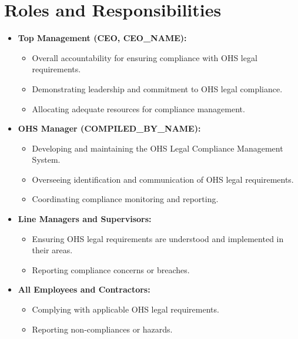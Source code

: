 \documentclass[12pt]{article}
\begin{document}
\section{Roles and Responsibilities}
\begin{itemize}
    \item \textbf{Top Management (CEO, {{CEO_NAME}}):}
    \begin{itemize}
        \item Overall accountability for ensuring compliance with OHS legal requirements.
        \item Demonstrating leadership and commitment to OHS legal compliance.
        \item Allocating adequate resources for compliance management.
    \end{itemize}
    \item \textbf{OHS Manager ({{COMPILED_BY_NAME}}):}
    \begin{itemize}
        \item Developing and maintaining the OHS Legal Compliance Management System.
        \item Overseeing identification and communication of OHS legal requirements.
        \item Coordinating compliance monitoring and reporting.
    \end{itemize}
    \item \textbf{Line Managers and Supervisors:}
    \begin{itemize}
        \item Ensuring OHS legal requirements are understood and implemented in their areas.
        \item Reporting compliance concerns or breaches.
    \end{itemize}
    \item \textbf{All Employees and Contractors:}
    \begin{itemize}
        \item Complying with applicable OHS legal requirements.
        \item Reporting non-compliances or hazards.
    \end{itemize}
\end{itemize}
\end{document}
